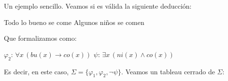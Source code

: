 \begin{example}
Un ejemplo sencillo. Veamos si es válida la siguiente deducción:

\begin{center}
{Todo lo bueno se come} 
{Algunos niños se comen}
\end{center}
Que formalizamos como:
\begin{center}
{$\varphi_2$: $\forall x \, (bu(x)\to co(x))$}
{$\psi$: $\exists x \, (ni(x)\land co(x))$}
\end{center}

Es decir, en este caso, $\Sigma = \{\varphi_1, \varphi_2, \neg \psi \}$. Veamos un tableau cerrado de $\Sigma$:

\end{example}
